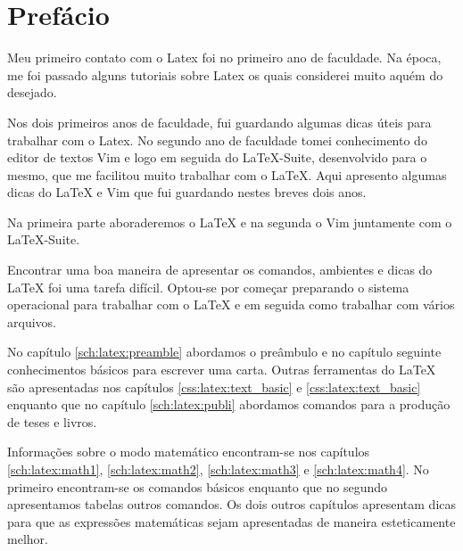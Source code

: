 % 
% 
% 
% 
% 
\chapter*{Prefácio}

Meu primeiro contato com o Latex foi no primeiro ano de faculdade. Na época, me foi passado alguns tutoriais sobre Latex os quais considerei muito aquém do desejado.

Nos dois primeiros anos de faculdade, fui guardando algumas dicas úteis para trabalhar com o Latex. No segundo ano de faculdade tomei conhecimento do editor de textos Vim e logo em seguida do LaTeX-Suite, desenvolvido para o mesmo, que me facilitou muito trabalhar com o LaTeX. Aqui apresento algumas dicas do LaTeX e Vim que fui guardando nestes breves dois anos.


Na primeira parte aboraderemos o LaTeX e na segunda o Vim juntamente com o LaTeX-Suite.

Encontrar uma boa maneira de apresentar os comandos, ambientes e dicas do LaTeX foi uma tarefa difícil. Optou-se por começar preparando o sistema operacional para trabalhar com o LaTeX e em seguida como trabalhar com vários arquivos.

No capítulo \ref{sch:latex:preamble} abordamos o preâmbulo e no capítulo seguinte conhecimentos básicos para escrever uma carta. Outras ferramentas do LaTeX são apresentadas nos capítulos  \ref{css:latex:text_basic} e \ref{css:latex:text_basic} enquanto que no capítulo \ref{sch:latex:publi} abordamos comandos para a produção de teses e livros.

Informações sobre o modo matemático encontram-se nos capítulos \ref{sch:latex:math1}, \ref{sch:latex:math2}, \ref{sch:latex:math3} e \ref{sch:latex:math4}. No primeiro encontram-se os comandos básicos enquanto que no segundo apresentamos tabelas outros comandos. Os dois outros capítulos apresentam dicas para que as expressões matemáticas sejam apresentadas de maneira esteticamente melhor.

